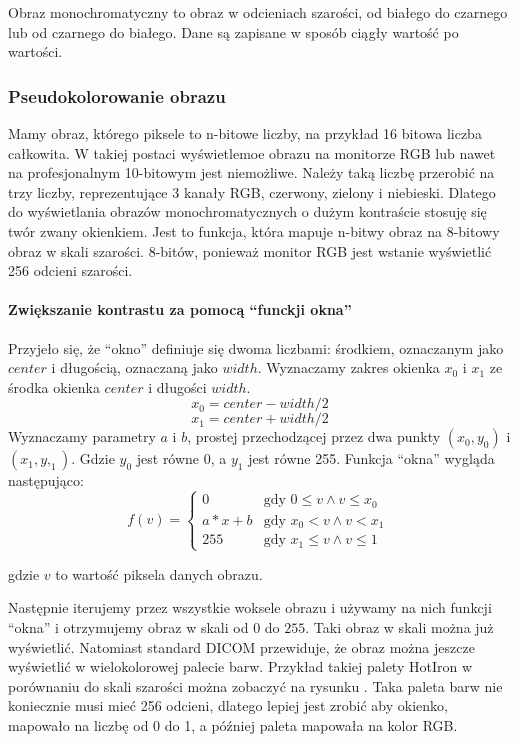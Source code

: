 \label{sec:algorithm-pixmap-monochrome}

Obraz monochromatyczny to obraz w odcieniach szarości, od białego do czarnego lub od czarnego do białego. Dane są zapisane w sposób ciągły wartość po wartości.

\subsubsection{Pseudokolorowanie obrazu}

Mamy obraz, którego piksele to n-bitowe liczby, na przykład 16 bitowa liczba całkowita.
W takiej postaci wyświetlemoe obrazu na monitorze RGB lub nawet na profesjonalnym 10-bitowym jest niemożliwe.
Należy taką liczbę przerobić na trzy liczby, reprezentujące 3 kanały RGB, czerwony, zielony i niebieski.
Dlatego do wyświetlania obrazów monochromatycznych o dużym kontraście stosuję się twór zwany okienkiem.
Jest to funkcja, która mapuje n-bitwy obraz na 8-bitowy obraz w skali szarości.
8-bitów, ponieważ monitor RGB jest wstanie wyświetlić 256 odcieni szarości.

\paragraph*{Zwiększanie kontrastu za pomocą \enquote{funckji okna}}
Przyjeło się, że \enquote{okno} definiuje się dwoma liczbami: środkiem, oznaczanym jako $center$ i długością, oznaczaną jako $width$.
Wyznaczamy zakres okienka $x_0$ i $x_1$ ze środka okienka $center$ i długości $width$.
\[x_0 = center - width / 2\]
\[x_1 = center + width / 2\]
Wyznaczamy parametry $a$ i $b$, prostej przechodzącej przez dwa punkty $(x_0, y_0)$ i $(x_1, y,_1)$.
Gdzie $y_0$ jest równe 0, a $y_1$ jest równe 255.
Funkcja \enquote{okna} wygląda następująco:
\[
    f(v)=
    \begin{cases}
        0     & \text{gdy $0 \le v \wedge v \le x_0$ } \\
        a*x+b & \text{gdy $x_0 < v \wedge v < x_1$}    \\
        255   & \text{gdy $x_1 \le v \wedge v \le 1$ }
    \end{cases}
\]

gdzie $v$ to wartość piksela danych obrazu.

Następnie iterujemy przez wszystkie woksele obrazu i używamy na nich funkcji \enquote{okna} i otrzymujemy obraz w skali od $0$ do $255$.
Taki obraz w skali można już wyświetlić.
Natomiast standard DICOM przewiduje, że obraz można jeszcze wyświetlić w wielokolorowej palecie barw.
Przykład takiej palety HotIron w porównaniu do skali szarości można zobaczyć na rysunku .
Taka paleta barw nie koniecznie musi mieć 256 odcieni, dlatego lepiej jest zrobić aby okienko, mapowało na liczbę od 0 do 1, a później paleta mapowała na kolor RGB.

